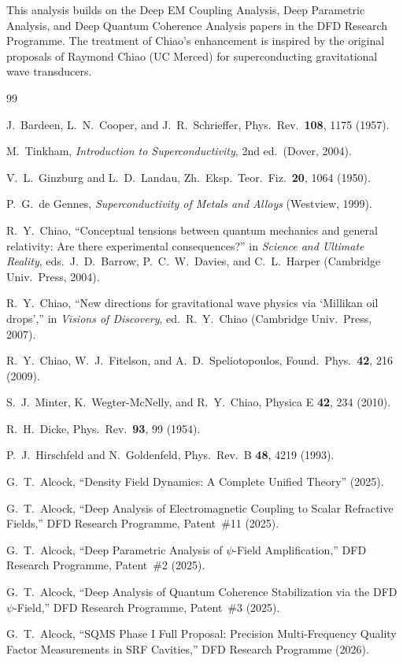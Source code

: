 \documentclass[12pt,aps,prd,twocolumn,superscriptaddress,nofootinbib]{revtex4-2}
\begin{document}
\begin{acknowledgments}
This analysis builds on the Deep EM Coupling Analysis, Deep Parametric
Analysis, and Deep Quantum Coherence Analysis papers in the DFD
Research Programme. The treatment of Chiao's enhancement is inspired
by the original proposals of Raymond Chiao (UC Merced) for
superconducting gravitational wave transducers.
\end{acknowledgments}

\begin{thebibliography}{99}

 J.\ Bardeen, L.\ N.\ Cooper, and J.\ R.\ Schrieffer,
Phys.\ Rev.\ \textbf{108}, 1175 (1957).

 M.\ Tinkham, \textit{Introduction to Superconductivity},
2nd ed.\ (Dover, 2004).

 V.\ L.\ Ginzburg and L.\ D.\ Landau,
Zh.\ Eksp.\ Teor.\ Fiz.\ \textbf{20}, 1064 (1950).

 P.\ G.\ de Gennes, \textit{Superconductivity of
Metals and Alloys} (Westview, 1999).

 R.\ Y.\ Chiao, ``Conceptual tensions between quantum
mechanics and general relativity: Are there experimental consequences?''
in \textit{Science and Ultimate Reality}, eds.\ J.\ D.\ Barrow,
P.\ C.\ W.\ Davies, and C.\ L.\ Harper (Cambridge Univ.\ Press, 2004).

 R.\ Y.\ Chiao, ``New directions for
gravitational wave physics via `Millikan oil drops','' in \textit{Visions
of Discovery}, ed.\ R.\ Y.\ Chiao (Cambridge Univ.\ Press, 2007).

 R.\ Y.\ Chiao, W.\ J.\ Fitelson, and
A.\ D.\ Speliotopoulos, Found.\ Phys.\ \textbf{42}, 216 (2009).

 S.\ J.\ Minter, K.\ Wegter-McNelly, and
R.\ Y.\ Chiao, Physica E \textbf{42}, 234 (2010).

 R.\ H.\ Dicke, Phys.\ Rev.\ \textbf{93}, 99 (1954).

 P.\ J.\ Hirschfeld and N.\ Goldenfeld,
Phys.\ Rev.\ B \textbf{48}, 4219 (1993).

 G.\ T.\ Alcock, ``Density Field Dynamics:
A Complete Unified Theory'' (2025).

 G.\ T.\ Alcock, ``Deep Analysis of
Electromagnetic Coupling to Scalar Refractive Fields,'' DFD Research
Programme, Patent~\#11 (2025).

 G.\ T.\ Alcock, ``Deep Parametric
Analysis of $\psi$-Field Amplification,'' DFD Research Programme,
Patent~\#2 (2025).

 G.\ T.\ Alcock, ``Deep Analysis of Quantum
Coherence Stabilization via the DFD $\psi$-Field,'' DFD Research
Programme, Patent~\#3 (2025).

 G.\ T.\ Alcock, ``SQMS Phase I Full Proposal:
Precision Multi-Frequency Quality Factor Measurements in SRF Cavities,''
DFD Research Programme (2026).

\end{thebibliography}
\end{document}
